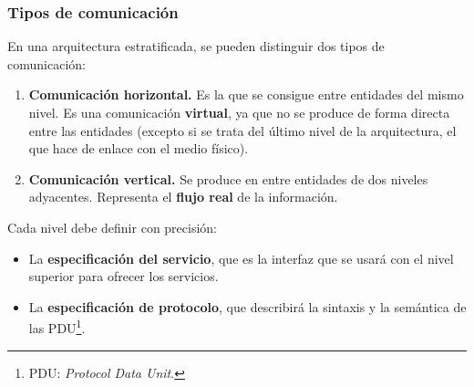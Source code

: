 \documentclass[a4paper]{book}
\begin{document}
\subsubsection{Tipos de comunicación}
En una arquitectura estratificada, se pueden distinguir dos tipos de comunicación:
\begin{enumerate}
  \item \textbf{Comunicación horizontal.} Es la que se consigue entre entidades del mismo nivel. Es una comunicación \textbf{virtual}, ya que no se produce de forma directa entre las entidades (excepto si se trata del último nivel de la arquitectura, el que hace de enlace con el medio físico).
  \item \textbf{Comunicación vertical.} Se produce en entre entidades de dos niveles adyacentes. Representa el \textbf{flujo real} de la información.
\end{enumerate}

Cada nivel debe definir con precisión:
\begin{itemize}
  \item La \textbf{especificación del servicio}, que es la interfaz que se usará con el nivel superior para ofrecer los servicios.
  \item La \textbf{especificación de protocolo}, que describirá la sintaxis y la semántica de las PDU\footnote{PDU: \textsl{Protocol Data Unit}.}.
\end{itemize}
\end{document}
